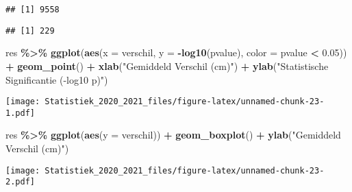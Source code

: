 \documentclass[
  12pt,dutch,coursenotes]{book}
\newenvironment{Shaded}{\begin{snugshade}}{\end{snugshade}}
\newcommand{\DataTypeTok}[1]{\textcolor[rgb]{0.13,0.29,0.53}{#1}}
\newcommand{\DecValTok}[1]{\textcolor[rgb]{0.00,0.00,0.81}{#1}}
\newcommand{\FloatTok}[1]{\textcolor[rgb]{0.00,0.00,0.81}{#1}}
\newcommand{\KeywordTok}[1]{\textcolor[rgb]{0.13,0.29,0.53}{\textbf{#1}}}
\newcommand{\NormalTok}[1]{#1}
\newcommand{\OperatorTok}[1]{\textcolor[rgb]{0.81,0.36,0.00}{\textbf{#1}}}
\newcommand{\StringTok}[1]{\textcolor[rgb]{0.31,0.60,0.02}{#1}}
\theoremstyle{definition}
\theoremstyle{definition}
\theoremstyle{definition}
\theoremstyle{remark}
\begin{document}
\begin{verbatim}
## [1] 9558
\end{verbatim}

\begin{Shaded}
\end{Shaded}

\begin{verbatim}
## [1] 229
\end{verbatim}

\begin{Shaded}
\begin{Highlighting}[]
\NormalTok{res }\OperatorTok{\%\textgreater{}\%}\StringTok{ }\KeywordTok{ggplot}\NormalTok{(}\KeywordTok{aes}\NormalTok{(}\DataTypeTok{x =}\NormalTok{ verschil, }\DataTypeTok{y =} \OperatorTok{{-}}\KeywordTok{log10}\NormalTok{(pvalue), }
    \DataTypeTok{color =}\NormalTok{ pvalue }\OperatorTok{\textless{}}\StringTok{ }\FloatTok{0.05}\NormalTok{)) }\OperatorTok{+}\StringTok{ }\KeywordTok{geom\_point}\NormalTok{() }\OperatorTok{+}\StringTok{ }\KeywordTok{xlab}\NormalTok{(}\StringTok{"Gemiddeld Verschil (cm)"}\NormalTok{) }\OperatorTok{+}\StringTok{ }
\StringTok{    }\KeywordTok{ylab}\NormalTok{(}\StringTok{"Statistische Significantie ({-}log10 p)"}\NormalTok{)}
\end{Highlighting}
\end{Shaded}

\texttt{[image: Statistiek\_2020\_2021\_files/figure-latex/unnamed-chunk-23-1.pdf]}

\begin{Shaded}
\begin{Highlighting}[]
\NormalTok{res }\OperatorTok{\%\textgreater{}\%}\StringTok{ }\KeywordTok{ggplot}\NormalTok{(}\KeywordTok{aes}\NormalTok{(}\DataTypeTok{y =}\NormalTok{ verschil)) }\OperatorTok{+}\StringTok{ }\KeywordTok{geom\_boxplot}\NormalTok{() }\OperatorTok{+}\StringTok{ }
\StringTok{    }\KeywordTok{ylab}\NormalTok{(}\StringTok{"Gemiddeld Verschil (cm)"}\NormalTok{)}
\end{Highlighting}
\end{Shaded}

\texttt{[image: Statistiek\_2020\_2021\_files/figure-latex/unnamed-chunk-23-2.pdf]}
\end{document}
